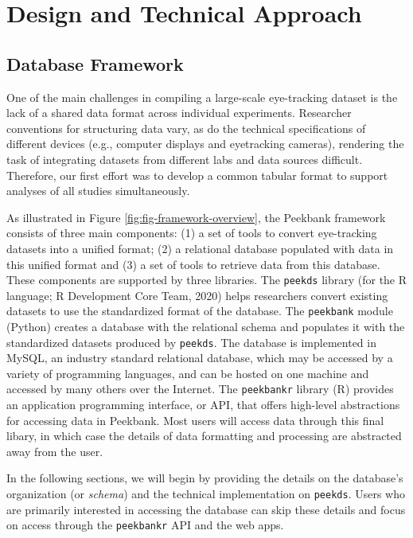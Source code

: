 \documentclass[
  english,
  man,floatsintext]{apa6}
\begin{document}
\hypertarget{design-and-technical-approach}{%
\section{Design and Technical Approach}\label{design-and-technical-approach}}

\hypertarget{database-framework}{%
\subsection{Database Framework}\label{database-framework}}

One of the main challenges in compiling a large-scale eye-tracking dataset is the lack of a shared data format across individual experiments.
Researcher conventions for structuring data vary, as do the technical specifications of different devices (e.g., computer displays and eyetracking cameras), rendering the task of integrating datasets from different labs and data sources difficult.
Therefore, our first effort was to develop a common tabular format to support analyses of all studies simultaneously.

As illustrated in Figure \ref{fig:fig-framework-overview}, the Peekbank framework consists of three main components: (1) a set of tools to convert eye-tracking datasets into a unified format; (2) a relational database populated with data in this unified format and (3) a set of tools to retrieve data from this database.
These components are supported by three libraries.
The \texttt{peekds} library (for the R language; R Development Core Team, 2020) helps researchers convert existing datasets to use the standardized format of the database.
The \texttt{peekbank} module (Python) creates a database with the relational schema and populates it with the standardized datasets produced by \texttt{peekds}.
The database is implemented in MySQL, an industry standard relational database, which may be accessed by a variety of programming languages, and can be hosted on one machine and accessed by many others over the Internet.
The \texttt{peekbankr} library (R) provides an application programming interface, or API, that offers high-level abstractions for accessing data in Peekbank.
Most users will access data through this final libary, in which case the details of data formatting and processing are abstracted away from the user.

In the following sections, we will begin by providing the details on the database's organization (or \textit{schema}) and the technical implementation on \texttt{peekds}.
Users who are primarily interested in accessing the database can skip these details and focus on access through the \texttt{peekbankr} API and the web apps.
\end{document}
